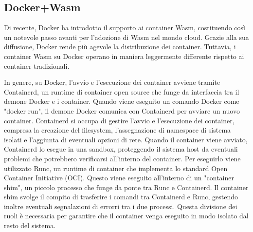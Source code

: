 \subsection{Docker+Wasm}
Di recente, Docker ha introdotto il supporto ai container Wasm\cite{docker-wasm-tech-preview}, costituendo così un
notevole passo avanti per l'adozione di Wasm nel mondo cloud. Grazie alla sua diffusione, Docker rende più agevole la
distribuzione dei container. Tuttavia, i container Wasm su Docker operano in maniera leggermente differente rispetto ai
container tradizionali.

In genere, su Docker, l'avvio e l'esecuzione dei container avviene tramite Containerd, un runtime di container open
source che funge da interfaccia tra il demone Docker e i container. Quando viene eseguito un comando Docker come "docker
run", il demone Docker comunica con Containerd per avviare un nuovo container. Containerd si occupa di gestire l'avvio e
l'esecuzione dei container, compresa la creazione del filesystem, l'assegnazione di namespace di sistema isolati e
l'aggiunta di eventuali opzioni di rete. Quando il container viene avviato, Containerd lo esegue in una sandbox,
proteggendo il sistema host da eventuali problemi che potrebbero verificarsi all'interno del container. Per eseguirlo
viene utilizzato Runc, un runtime di container che implementa lo standard Open Container Initiative (OCI). Questo viene
eseguito all'interno di un "container shim", un piccolo processo che funge da ponte tra Runc e Containerd. Il container
shim svolge il compito di trasferire i comandi tra Containerd e Runc, gestendo inoltre eventuali segnalazioni di errorri
tra i due processi. Questa divisione dei ruoli è necessaria per garantire che il container venga eseguito in modo
isolato dal resto del sistema.


